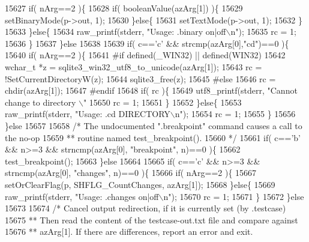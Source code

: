 \begin{DoxyCode}
{{{{15627     \textcolor{keywordflow}{if}( nArg==2 )\{
15628       \textcolor{keywordflow}{if}( booleanValue(azArg[1]) )\{
15629         setBinaryMode(p->out, 1);
15630       \}\textcolor{keywordflow}{else}\{
15631         setTextMode(p->out, 1);
15632       \}
15633     \}\textcolor{keywordflow}{else}\{
15634       raw_printf(stderr, \textcolor{stringliteral}{"Usage: .binary on|off\(\backslash\)n"});
15635       rc = 1;
15636     \}
15637   \}\textcolor{keywordflow}{else}
15638 
15639   \textcolor{keywordflow}{if}( c==\textcolor{charliteral}{'c'} && strcmp(azArg[0],\textcolor{stringliteral}{"cd"})==0 )\{
15640     \textcolor{keywordflow}{if}( nArg==2 )\{
15641 \textcolor{preprocessor}{#if defined(\_WIN32) || defined(WIN32)}
15642       \textcolor{keywordtype}{wchar\_t} *z = sqlite3\_win32\_utf8\_to\_unicode(azArg[1]);
15643       rc = !SetCurrentDirectoryW(z);
15644       sqlite3_free(z);
15645 \textcolor{preprocessor}{#else}
15646       rc = chdir(azArg[1]);
15647 \textcolor{preprocessor}{#endif}
15648       \textcolor{keywordflow}{if}( rc )\{
15649         utf8_printf(stderr, \textcolor{stringliteral}{"Cannot change to directory \(\backslash\)"%
15650         rc = 1;
15651       \}
15652     \}\textcolor{keywordflow}{else}\{
15653       raw_printf(stderr, \textcolor{stringliteral}{"Usage: .cd DIRECTORY\(\backslash\)n"});
15654       rc = 1;
15655     \}
15656   \}\textcolor{keywordflow}{else}
15657 
15658   \textcolor{comment}{/* The undocumented ".breakpoint" command causes a call to the no-op}
15659 \textcolor{comment}{  ** routine named test\_breakpoint().}
15660 \textcolor{comment}{  */}
15661   \textcolor{keywordflow}{if}( c==\textcolor{charliteral}{'b'} && n>=3 && strncmp(azArg[0], \textcolor{stringliteral}{"breakpoint"}, n)==0 )\{
15662     test_breakpoint();
15663   \}\textcolor{keywordflow}{else}
15664 
15665   \textcolor{keywordflow}{if}( c==\textcolor{charliteral}{'c'} && n>=3 && strncmp(azArg[0], \textcolor{stringliteral}{"changes"}, n)==0 )\{
15666     \textcolor{keywordflow}{if}( nArg==2 )\{
15667       setOrClearFlag(p, SHFLG_CountChanges, azArg[1]);
15668     \}\textcolor{keywordflow}{else}\{
15669       raw_printf(stderr, \textcolor{stringliteral}{"Usage: .changes on|off\(\backslash\)n"});
15670       rc = 1;
15671     \}
15672   \}\textcolor{keywordflow}{else}
15673 
15674   \textcolor{comment}{/* Cancel output redirection, if it is currently set (by .testcase)}
15675 \textcolor{comment}{  ** Then read the content of the testcase-out.txt file and compare against}
15676 \textcolor{comment}{  ** azArg[1].  If there are differences, report an error and exit.}
}}}}}
\end{DoxyCode}

